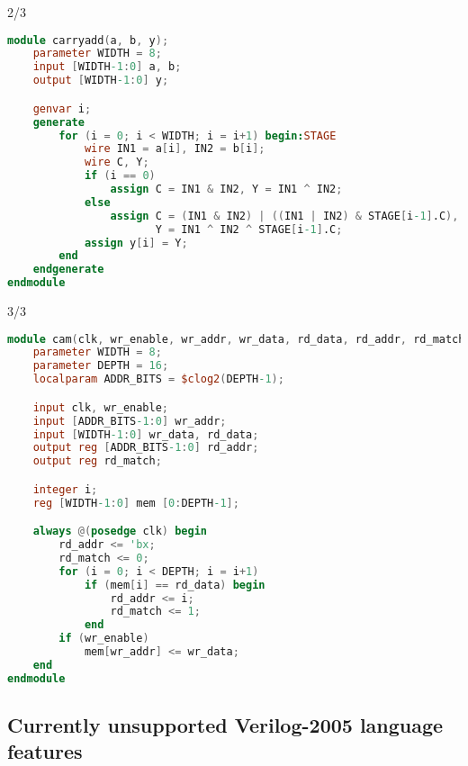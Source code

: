 \begin{frame}[fragile]{\subsecname{} 2/3}
\begin{lstlisting}[xleftmargin=1cm, basicstyle=\ttfamily\fontsize{8pt}{10pt}\selectfont, language=Verilog]
module carryadd(a, b, y);
    parameter WIDTH = 8;
    input [WIDTH-1:0] a, b;
    output [WIDTH-1:0] y;

    genvar i;
    generate
        for (i = 0; i < WIDTH; i = i+1) begin:STAGE
            wire IN1 = a[i], IN2 = b[i];
            wire C, Y;
            if (i == 0)
                assign C = IN1 & IN2, Y = IN1 ^ IN2;
            else
                assign C = (IN1 & IN2) | ((IN1 | IN2) & STAGE[i-1].C),
                       Y = IN1 ^ IN2 ^ STAGE[i-1].C;
            assign y[i] = Y;
        end
    endgenerate
endmodule
\end{lstlisting}
\end{frame}

\begin{frame}[fragile]{\subsecname{} 3/3}
\begin{lstlisting}[xleftmargin=1cm, basicstyle=\ttfamily\fontsize{7pt}{8.5pt}\selectfont, language=Verilog]
module cam(clk, wr_enable, wr_addr, wr_data, rd_data, rd_addr, rd_match);
    parameter WIDTH = 8;
    parameter DEPTH = 16;
    localparam ADDR_BITS = $clog2(DEPTH-1);

    input clk, wr_enable;
    input [ADDR_BITS-1:0] wr_addr;
    input [WIDTH-1:0] wr_data, rd_data;
    output reg [ADDR_BITS-1:0] rd_addr;
    output reg rd_match;

    integer i;
    reg [WIDTH-1:0] mem [0:DEPTH-1];

    always @(posedge clk) begin
        rd_addr <= 'bx;
        rd_match <= 0;
        for (i = 0; i < DEPTH; i = i+1)
            if (mem[i] == rd_data) begin
                rd_addr <= i;
                rd_match <= 1;
            end
        if (wr_enable)
            mem[wr_addr] <= wr_data;
    end
endmodule
\end{lstlisting}
\end{frame}


\subsection{Currently unsupported Verilog-2005 language features}

